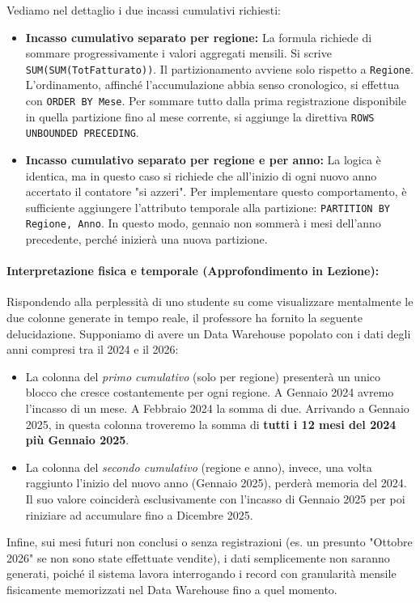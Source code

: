 Vediamo nel dettaglio i due incassi cumulativi richiesti:
\begin{itemize}
    \item \textbf{Incasso cumulativo separato per regione:}
    La formula richiede di sommare progressivamente i valori aggregati mensili. Si scrive \texttt{SUM(SUM(TotFatturato))}. Il partizionamento avviene solo rispetto a \texttt{Regione}. L'ordinamento, affinché l'accumulazione abbia senso cronologico, si effettua con \texttt{ORDER BY Mese}. Per sommare tutto dalla prima registrazione disponibile in quella partizione fino al mese corrente, si aggiunge la direttiva \texttt{ROWS UNBOUNDED PRECEDING}.
    
    \item \textbf{Incasso cumulativo separato per regione e per anno:}
    La logica è identica, ma in questo caso si richiede che all'inizio di ogni nuovo anno accertato il contatore "si azzeri". Per implementare questo comportamento, è sufficiente aggiungere l'attributo temporale alla partizione: \texttt{PARTITION BY Regione, Anno}. In questo modo, gennaio non sommerà i mesi dell'anno precedente, perché inizierà una nuova partizione.
\end{itemize}

\paragraph{Interpretazione fisica e temporale (Approfondimento in Lezione):}
Rispondendo alla perplessità di uno studente su come visualizzare mentalmente le due colonne generate in tempo reale, il professore ha fornito la seguente delucidazione. Supponiamo di avere un Data Warehouse popolato con i dati degli anni compresi tra il 2024 e il 2026:
\begin{itemize}
    \item La colonna del \textit{primo cumulativo} (solo per regione) presenterà un unico blocco che cresce costantemente per ogni regione. A Gennaio 2024 avremo l'incasso di un mese. A Febbraio 2024 la somma di due. Arrivando a Gennaio 2025, in questa colonna troveremo la somma di \textbf{tutti i 12 mesi del 2024 più Gennaio 2025}. 
    \item La colonna del \textit{secondo cumulativo} (regione e anno), invece, una volta raggiunto l'inizio del nuovo anno (Gennaio 2025), perderà memoria del 2024. Il suo valore coinciderà esclusivamente con l'incasso di Gennaio 2025 per poi riniziare ad accumulare fino a Dicembre 2025.
\end{itemize}
Infine, sui mesi futuri non conclusi o senza registrazioni (es. un presunto "Ottobre 2026" se non sono state effettuate vendite), i dati semplicemente non saranno generati, poiché il sistema lavora interrogando i record con granularità mensile fisicamente memorizzati nel Data Warehouse fino a quel momento.

